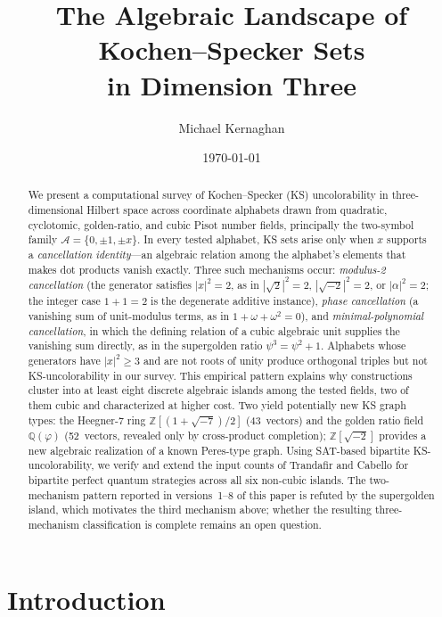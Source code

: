 \documentclass[12pt,a4paper]{article}
\title{The Algebraic Landscape of Kochen--Specker Sets\\in Dimension Three}
\author{Michael Kernaghan}
\date{\today}
\newcommand{\Z}{\mathbb{Z}}
\newcommand{\Q}{\mathbb{Q}}
\begin{document}
\maketitle

\begin{abstract}
We present a computational survey of Kochen--Specker (KS) uncolorability in three-dimensional Hilbert space across coordinate alphabets drawn from quadratic, cyclotomic, golden-ratio, and cubic Pisot number fields, principally the two-symbol family $\mathcal{A} = \{0, \pm 1, \pm x\}$. In every tested alphabet, KS sets arise only when $x$ supports a \emph{cancellation identity}---an algebraic relation among the alphabet's elements that makes dot products vanish exactly.  Three such mechanisms occur: \emph{modulus-2 cancellation} (the generator satisfies $|x|^2 = 2$, as in $|\sqrt{2}|^2=2$, $|\sqrt{-2}|^2=2$, or $|\alpha|^2=2$; the integer case $1+1=2$ is the degenerate additive instance), \emph{phase cancellation} (a vanishing sum of unit-modulus terms, as in $1+\omega+\omega^2=0$), and \emph{minimal-polynomial cancellation}, in which the defining relation of a cubic algebraic unit supplies the vanishing sum directly, as in the supergolden ratio $\psi^3 = \psi^2 + 1$. Alphabets whose generators have $|x|^2 \geq 3$ and are not roots of unity produce orthogonal triples but not KS-uncolorability in our survey. This empirical pattern explains why constructions cluster into at least eight discrete algebraic islands among the tested fields, two of them cubic and characterized at higher cost. Two yield potentially new KS graph types: the Heegner-7 ring $\Z[(1+\sqrt{-7})/2]$ (43~vectors) and the golden ratio field $\Q(\varphi)$ (52~vectors, revealed only by cross-product completion); $\Z[\sqrt{-2}]$ provides a new algebraic realization of a known Peres-type graph. Using SAT-based bipartite KS-uncolorability, we verify and extend the input counts of Trandafir and Cabello for bipartite perfect quantum strategies across all six non-cubic islands. The two-mechanism pattern reported in versions~1--8 of this paper is refuted by the supergolden island, which motivates the third mechanism above; whether the resulting three-mechanism classification is complete remains an open question.
\end{abstract}

\section{Introduction}
\end{document}
